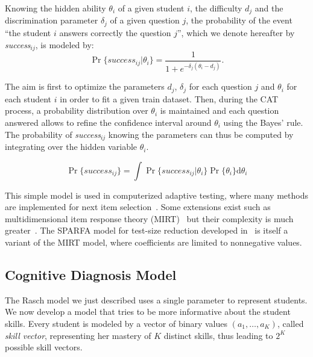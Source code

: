 \documentclass{sig-alternate}
\begin{document}
Knowing the hidden ability $\theta_i$ of a given student $i$, the difficulty $d_j$ and the discrimination parameter $\delta_j$ of a given question $j$, the probability of the event ``the student $i$ answers correctly the question $j$'', which we denote hereafter by \emph{success}$_{ij}$, is modeled by:
\[ \Pr\{success_{ij}|\theta_i\} = \frac1{1+e^{-\delta_j(\theta_i - d_j)}}. \]

The aim is first to optimize the parameters $d_j$, $\delta_j$ for each question $j$ and $\theta_i$ for each student $i$ in order to fit a given train dataset. Then, during the CAT process, a probability distribution over $\theta_i$ is maintained and each question answered allows to refine the confidence interval around $\theta_i$ using the Bayes' rule. The probability of \emph{success}$_{ij}$ knowing the parameters can thus be computed by integrating over the hidden variable $\theta_i$.

\[ \Pr\{success_{ij}\} = \int \Pr\{success_{ij}|\theta_i\} \Pr\{\theta_i\} \mathrm d\theta_i \]

This simple model is used in computerized adaptive testing, where many methods are implemented for next item selection~\cite{MagisRaiche2012}. Some extensions exist such as multidimensional item response theory (MIRT)~\cite{Segall1996} but their complexity is much greater~\cite{Desmarais2012}. The SPARFA model for test-size reduction developed in~\cite{Vats2013} is itself a variant of the MIRT model, where coefficients are limited to nonnegative values.

\subsection{Cognitive Diagnosis Model}

The Rasch model we just described uses a single parameter to represent students. We now develop a model that tries to be more informative about the student skills. Every student is modeled by a vector of binary values $(a_1, \ldots, a_K)$, called \emph{skill vector}, representing her mastery of $K$ distinct skills, thus leading to $2^K$ possible skill vectors. 
\end{document}
